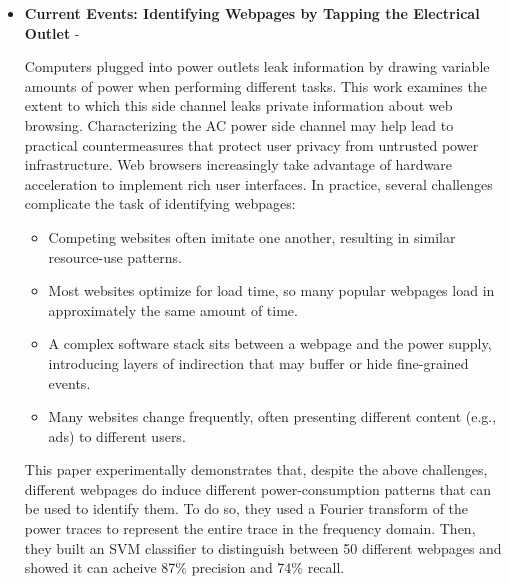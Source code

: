 \begin{itemize}
    
    \item   \textbf{Current Events: Identifying Webpages by Tapping the Electrical Outlet}\cite{Identifying_Webpages} -\newline
    
    Computers plugged into power outlets leak information by drawing variable amounts of power when performing different tasks. 
    This work examines the extent to which this side channel leaks private information about web browsing.
    Characterizing the AC power side channel may help lead to practical countermeasures that protect user privacy from untrusted power infrastructure.
    Web browsers increasingly take advantage of hardware acceleration to implement rich user interfaces. In practice, several challenges complicate the task of identifying webpages:
    \begin{itemize}
        \item Competing websites often imitate one another, resulting in similar resource-use patterns.
        \item Most websites optimize for load time, so many popular webpages load in approximately the same amount of time.
        \item A complex software stack sits between a webpage and the power supply, introducing layers of indirection that may buffer or hide fine-grained events.
        \item Many websites change frequently, often presenting different content (e.g., ads) to different users.
      \end{itemize}

      This paper experimentally demonstrates that, despite the above challenges, 
      different webpages do induce different power-consumption patterns that can be used to 
      identify them.\newline 
      To do so, they used a Fourier transform of the power traces to represent
      the entire trace in the frequency domain.
      Then, they built an SVM classifier to distinguish between 50 different webpages and showed it 
      can acheive 87\% precision and 74\% recall.


    \end{itemize}